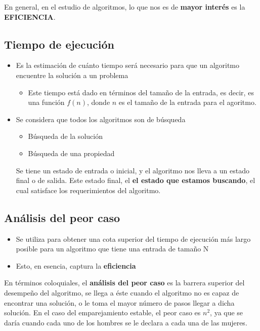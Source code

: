 \documentclass[letterpaper, 12pt]{article}
\begin{document}
En general, en el estudio de algoritmos, lo que nos es de \textbf{mayor interés} es la
\textbf{EFICIENCIA}.
\subsection{Tiempo de ejecución}
\label{sec:orge3512cb}
\begin{itemize}
\item Es la estimación de cuánto tiempo será necesario para que un algoritmo
encuentre la solución a un problema
\begin{itemize}
\item Este tiempo está dado en términos del tamaño de la entrada, es decir, es
una función \(f(n)\), donde \(n\) es el tamaño de la entrada para el agoritmo.
\end{itemize}
\item Se considera que todos los algoritmos son de búsqueda
\begin{itemize}
\item Búsqueda de la solución
\item Búsqueda de una propiedad
\end{itemize}
Se tiene un estado de entrada o inicial, y el algoritmo nos lleva a un estado
final o de salida. Este estado final, el \textbf{el estado que estamos buscando}, el
cual satisface los requerimientos del algoritmo.
\end{itemize}
\subsection{Análisis del peor caso}
\label{sec:orgdb80a3d}
\begin{itemize}
\item Se utiliza para obtener una cota superior del tiempo de ejecución más largo
posible para un algoritmo que tiene una entrada de tamaño N
\item Esto, en esencia, captura la \textbf{eficiencia}
\end{itemize}

En términos coloquiales, el \textbf{análisis del peor caso} es la barrera superior del
desempeño del algoritmo, se llega a éste cuando el algoritmo no es capaz de
encontrar una solución, o le toma el mayor número de pasos llegar a dicha
solución. En el caso del emparejamiento estable, el peor caso es \(n^2\), ya que
se daría cuando cada uno de los hombres se le declara a cada una de las
mujeres.
\end{document}
